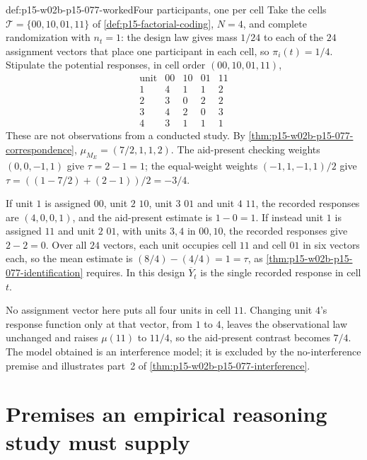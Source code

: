\begin{hbexample}{def:p15-w02b-p15-077-worked}{Four participants, one per cell}
Take the cells \(\mathcal T=\{00,10,01,11\}\) of
\cref{def:p15-factorial-coding}, \(N=4\), and complete randomization with
\(n_t=1\): the design law gives mass \(1/24\) to each of the
\(24\) assignment vectors that place one participant in each cell, so
\(\pi_i(t)=1/4\). Stipulate the potential responses, in cell order
\((00,10,01,11)\),
\[
\begin{array}{c|cccc}
 \text{unit}&00&10&01&11\\\hline
 1&4&1&1&2\\
 2&3&0&2&2\\
 3&4&2&0&3\\
 4&3&1&1&1
\end{array}
\]
These are not observations from a conducted study. By
\cref{thm:p15-w02b-p15-077-correspondence},
\(\mu_{M_E}=(7/2,1,1,2)\). The aid-present checking weights
\((0,0,-1,1)\) give \(\tau=2-1=1\); the equal-weight weights
\((-1,1,-1,1)/2\) give \(\tau=((1-7/2)+(2-1))/2=-3/4\).

If unit \(1\) is assigned \(00\), unit \(2\) \(10\), unit \(3\)
\(01\) and unit \(4\) \(11\), the recorded responses are
\((4,0,0,1)\), and the aid-present estimate is \(1-0=1\). If instead
unit \(1\) is assigned \(11\) and unit \(2\) \(01\), with units
\(3,4\) in \(00,10\), the recorded responses give \(2-2=0\). Over all
\(24\) vectors, each unit occupies cell \(11\) and cell \(01\) in six
vectors each, so the mean estimate is
\((8/4)-(4/4)=1=\tau\), as \cref{thm:p15-w02b-p15-077-identification}
requires. In this design \(\overline Y_t\) is the single recorded response
in cell \(t\).

No assignment vector here puts all four units in cell \(11\). Changing
unit \(4\)'s response function only at that vector, from \(1\) to \(4\),
leaves the observational law unchanged and raises \(\mu(11)\) to
\(11/4\), so the aid-present contrast becomes \(7/4\). The model obtained
is an interference model; it is excluded by the no-interference premise and
illustrates part~2 of \cref{thm:p15-w02b-p15-077-interference}.
\end{hbexample}

\section{Premises an empirical reasoning study must supply}
\label{sec:p15-w02b-p15-077-studies}

